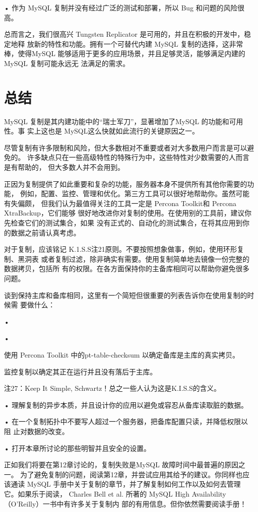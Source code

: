 • 作为 MySQL 复制并没有经过广泛的测试和部署，所以 Bug 和问题的风险很高。

总而言之，我们很高兴 Tungsten Replicator 是可用的，并且在积极的开发中，稳定地释
放新的特性和功能。拥有一个可替代内建 MySQL 复制的选择，这非常棒，使得MySQL
能够适用于更多的应用场景，并且足够灵活，能够满足内建的MySQL 复制可能永远无
法满足的需求。

\section{总结}
MySQL 复制是其内建功能中的“瑞士军刀”，显著增加了MySQL 的功能和可用性。事
实上这也是 MySQL这么快就如此流行的关键原因之一。

尽管复制有许多限制和风险，但大多数相对不重要或者对大多数用户而言是可以避免的。
许多缺点只在一些高级特性的特殊行为中，这些特性对少数需要的人而言是有帮助的，
但大多数人并不会用到。

正因为复制提供了如此重要和复杂的功能，服务器本身不提供所有其他你需要的功能，
例如，配置、监控、管理和优化。第三方工具可以很好地帮助你。虽然可能有失偏颇，
但我们认为最值得关注的工具一定是 Percona Toolkit和 Percona XtraBackup，它们能够
很好地改进你对复制的使用。在使用别的工具前，建议你先检查它们的测试集合，如果
没有正式的、自动化的测试集合，在将其应用到你的数据之前请认真考虑。

对于复制，应该铭记 K.1.S.S注21原则。不要按照想象做事，例如，使用环形复制、黑洞表
或者复制过滤，除非确实有需要。使用复制简单地去镜像一份完整的数据拷贝，包括所
有的权限。在各方面保持你的主备库相同可以帮助你避免很多问题。

谈到保持主库和备库相同，这里有一个简短但很重要的列表告诉你在使用复制的时候需
要做什么：

•

•

使用 Percona Toolkit 中的pt-table-checksum 以确定备库是主库的真实拷贝。

监控复制以确定其正在运行并且没有落后于主库。

注27：Keep It Simple, Schwartz！总之一些人认为这是K.I.S.S的含义。

• 理解复制的异步本质，并且设计你的应用以避免或容忍从备库读取脏的数据。

• 在一个复制拓扑中不要写人超过一个服务器，把备库配置只读，并降低权限以阻
止对数据的改变。

• 打开本章所讨论的那些明智并且安全的设置。

正如我们将要在第12章讨论的，复制失败是MySQL 故障时间中最普遍的原因之一。
为了避免复制的问题，阅读第12章，并尝试应用其给予的建议。你同样也应该通读
MySQL 手册中关于复制的章节，并了解复制如何工作以及如何去管理它。如果乐于阅读，
Charles Bell et al. 所著的 MySQL High Availability （O'Reilly）一书中有许多关于复制内
部的有用信息。但你依然需要阅读手册！


